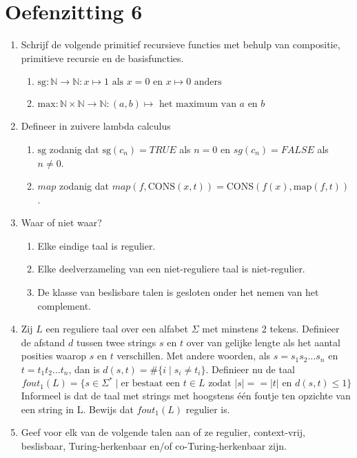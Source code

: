 \documentclass[a4paper]{article}
\begin{document}
\pagestyle{empty}

\section*{Oefenzitting 6}


\begin{enumerate}
  \item Schrijf de volgende primitief recursieve functies met behulp van compositie, primitieve recursie en de basisfuncties.
  \begin{enumerate}
    \item $\mbox{sg} : \mathbb{N} \to \mathbb{N} : x \mapsto 1 \text{ als $x = 0$ en $x \mapsto 0$ anders}$
    \item $\mbox{max} : \mathbb{N} \times \mathbb{N} \to \mathbb{N} : (a,b) \mapsto \text{ het maximum van $a$ en $b$}$
  \end{enumerate}
  \item Defineer in zuivere lambda calculus
  \begin{enumerate}
    \item $\mbox{sg}$ zodanig dat $\mbox{sg}(c_n) = TRUE$ als $n = 0$ en $sg(c_n) = FALSE$ als $n \neq 0$.
    \item $map$ zodanig dat $map(f,\mbox{CONS}(x,t)) = \mbox{CONS}(f(x),\mbox{map}(f,t))$.
  \end{enumerate}
  \item Waar of niet waar?
  \begin{enumerate}
      \item Elke eindige taal is regulier.
      \item Elke deelverzameling van een niet-reguliere taal is niet-regulier.
      \item De klasse van beslisbare talen is gesloten onder het nemen van het complement.
  \end{enumerate}
  \item Zij $L$ een reguliere taal over een alfabet $\Sigma$ met minstens 2 tekens. Definieer de afstand $d$ tussen twee strings $s$ en $t$ over van gelijke lengte als het aantal posities waarop $s$ en $t$ verschillen. Met andere woorden, als $s = s_1s_2\ldots s_n$ en $t = t_1t_2\ldots t_n$, dan is $d(s,t) = \#\{ i \mid s_i \neq t_i \}$. Definieer nu de taal
  \[ fout_1(L) = \{s \in \Sigma^* \mid \text{er bestaat een $t \in L$ zodat $|s| == |t|$ en $d(s,t) \leq 1$} \}\]
  Informeel is dat de taal met strings met hoogstens \'e\'en foutje ten opzichte van een string in L. Bewijs dat $fout_1(L)$ regulier is.
  \item Geef voor elk van de volgende talen aan of ze regulier, context-vrij, beslisbaar, Turing-herkenbaar en/of co-Turing-herkenbaar zijn.

\end{enumerate}
\end{document}
